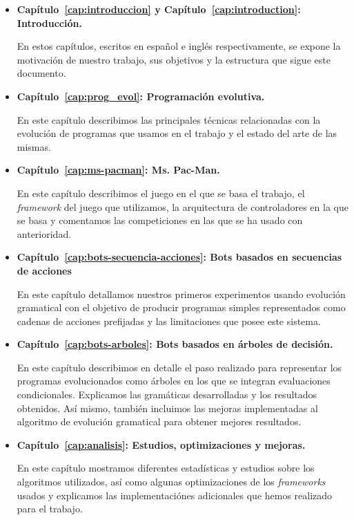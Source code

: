 \begin{itemize}
\item \textbf{Capítulo~\ref{cap:introduccion} y Capítulo~\ref{cap:introduction}: Introducción.}

En estos capítulos, escritos en español e inglés respectivamente, se expone la motivación de nuestro trabajo, sus objetivos y la estructura que sigue este documento.

\item \textbf{Capítulo~\ref{cap:prog_evol}: Programación evolutiva.}

En este capítulo describimos las principales técnicas relacionadas con la evolución de programas que usamos en el trabajo y el estado del arte de las mismas.

\item \textbf{Capítulo~\ref{cap:ms-pacman}: Ms. Pac-Man.}

En este capítulo describimos el juego en el que se basa el trabajo, el \textit{framework} del juego que utilizamos, la arquitectura de controladores en la que se basa y comentamos las competiciones en las que se ha usado con anterioridad.

\item \textbf{Capítulo~\ref{cap:bots-secuencia-acciones}: Bots basados en secuencias de acciones}

En este capítulo detallamos nuestros primeros experimentos usando evolución gramatical con el objetivo de producir programas simples representados como cadenas de acciones prefijadas y las limitaciones que posee este sistema.

\item \textbf{Capítulo~\ref{cap:bots-arboles}: Bots basados en árboles de decisión.}

En este capítulo describimos en detalle el paso realizado para representar los programas evolucionados como árboles en los que se integran evaluaciones condicionales. Explicamos las gramáticas desarrolladas y los resultados obtenidos. Así mismo, también incluimos las mejoras implementadas al algoritmo de evolución gramatical para obtener mejores resultados.

\item \textbf{Capítulo~\ref{cap:analisis}: Estudios, optimizaciones y mejoras.}

En este capítulo mostramos diferentes estadísticas y estudios sobre los algoritmos utilizados, así como algunas optimizaciones de los \textit{frameworks} usados y explicamos las implementaciónes adicionales que hemos realizado para el trabajo.


\end{itemize}
